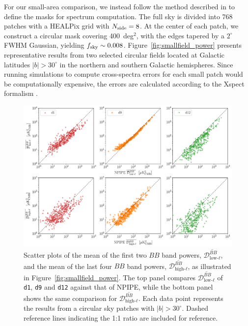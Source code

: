 \documentclass[twocolumn]{aastex631}
\begin{document}
For our small-area comparison, we instead follow the method described in \cite{planck2014-XXX} to define the masks for spectrum computation. The full sky is divided into 768 patches with a HEALPix grid with $N_{\rm side} = 8$. At the center of each patch, we construct a circular mask covering 400~deg$^2$, with the edges tapered by a $2^\circ$ FWHM Gaussian, yielding $f_{\rm sky} \sim 0.008$. Figure~\ref{fig:smallfield_power} presents representative results from two selected circular fields located at Galactic latitudes $|b| > 30^\circ$ in the northern and southern Galactic hemispheres. Since running simulations to compute cross-spectra errors for each small patch would be computationally expensive, the errors are calculated according to the Xspect formalism \citep{Tristram:2005}. 

\begin{figure}
    \centering
    \includegraphics[width=2.1\columnwidth]{figures/llmean_hlmean_comparison.pdf}
    \caption{Scatter plots of the mean of the first two $BB$ band powers, $\overline{\mathcal{D}_{\text{low-}\ell}^{BB}}$, and the mean of the last four $BB$ band powers, $\overline{\mathcal{D}_{\text{high-}\ell}^{BB}}$, as illustrated in Figure~\ref{fig:smallfield_power}. The top panel compares $\overline{\mathcal{D}_{\text{low-}\ell}^{BB}}$ of \texttt{d1}, \texttt{d9} and \texttt{d12} against that of NPIPE, while the bottom panel shows the same comparison for $\overline{\mathcal{D}_{\text{high-}\ell}^{BB}}$. Each data point represents the results from a circular sky patches with $|b| > 30^\circ$. Dashed reference lines indicating the 1:1 ratio are included for reference.}
    \label{fig:smallfield_power_all}
\end{figure}
\end{document}
